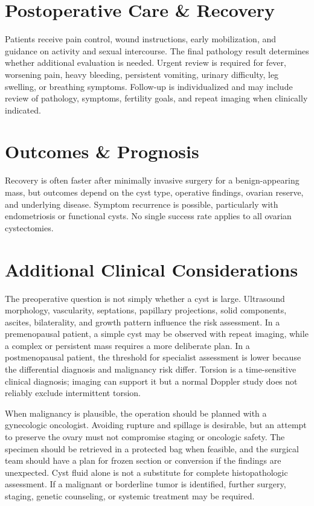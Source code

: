 \section*{Postoperative Care \& Recovery}
Patients receive pain control, wound instructions, early mobilization, and guidance on activity and sexual intercourse. The final pathology result determines whether additional evaluation is needed. Urgent review is required for fever, worsening pain, heavy bleeding, persistent vomiting, urinary difficulty, leg swelling, or breathing symptoms. Follow-up is individualized and may include review of pathology, symptoms, fertility goals, and repeat imaging when clinically indicated.

\section*{Outcomes \& Prognosis}
Recovery is often faster after minimally invasive surgery for a benign-appearing mass, but outcomes depend on the cyst type, operative findings, ovarian reserve, and underlying disease. Symptom recurrence is possible, particularly with endometriosis or functional cysts. No single success rate applies to all ovarian cystectomies.

\section*{Additional Clinical Considerations}
The preoperative question is not simply whether a cyst is large. Ultrasound morphology, vascularity, septations, papillary projections, solid components, ascites, bilaterality, and growth pattern influence the risk assessment. In a premenopausal patient, a simple cyst may be observed with repeat imaging, while a complex or persistent mass requires a more deliberate plan. In a postmenopausal patient, the threshold for specialist assessment is lower because the differential diagnosis and malignancy risk differ. Torsion is a time-sensitive clinical diagnosis; imaging can support it but a normal Doppler study does not reliably exclude intermittent torsion.

When malignancy is plausible, the operation should be planned with a gynecologic oncologist. Avoiding rupture and spillage is desirable, but an attempt to preserve the ovary must not compromise staging or oncologic safety. The specimen should be retrieved in a protected bag when feasible, and the surgical team should have a plan for frozen section or conversion if the findings are unexpected. Cyst fluid alone is not a substitute for complete histopathologic assessment. If a malignant or borderline tumor is identified, further surgery, staging, genetic counseling, or systemic treatment may be required.

